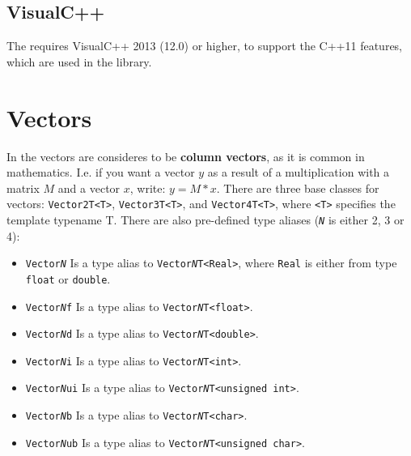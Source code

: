 \documentclass{article}
\begin{document}
\subsection*{VisualC++}

The \gausslib requires VisualC++ 2013 (12.0) or higher, to support the C++11 features, which are used in the library.



\section*{Vectors}

In the \gausslib vectors are consideres to be \textbf{column vectors}, as it is common in mathematics.
I.e. if you want a vector $y$ as a result of a multiplication with a matrix $M$ and a vector $x$,
write: $y = M * x$.
There are three base classes for vectors: \texttt{Vector2T<T>}, \texttt{Vector3T<T>}, and \texttt{Vector4T<T>},
where \texttt{<T>} specifies the template typename T. There are also pre-defined type aliases
(\texttt{\textit{N}} is either 2, 3 or 4):
\begin{itemize}
	\item \texttt{Vector\textit{N}} Is a type alias to \texttt{Vector\textit{N}T<Real>}, where \texttt{Real} is either
		from type \texttt{float} or \texttt{double}.
	\item \texttt{Vector\textit{N}f} Is a type alias to \texttt{Vector\textit{N}T<float>}.
	\item \texttt{Vector\textit{N}d} Is a type alias to \texttt{Vector\textit{N}T<double>}.
	\item \texttt{Vector\textit{N}i} Is a type alias to \texttt{Vector\textit{N}T<int>}.
	\item \texttt{Vector\textit{N}ui} Is a type alias to \texttt{Vector\textit{N}T<unsigned int>}.
	\item \texttt{Vector\textit{N}b} Is a type alias to \texttt{Vector\textit{N}T<char>}.
	\item \texttt{Vector\textit{N}ub} Is a type alias to \texttt{Vector\textit{N}T<unsigned char>}.
\end{itemize}
\end{document}

